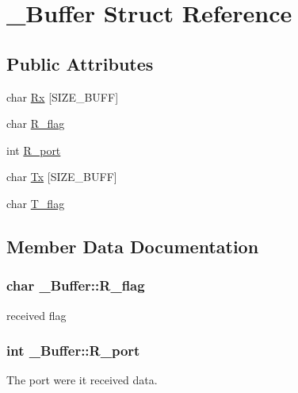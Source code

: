\hypertarget{struct___buffer}{}\section{\+\_\+\+Buffer Struct Reference}
\label{struct___buffer}
\subsection*{Public Attributes}
\begin{DoxyCompactItemize}
\item 
char \hyperlink{struct___buffer_a8c44c403d9e3f8ddefd09d410312375b}{Rx} \mbox{[}S\+I\+Z\+E\+\_\+\+B\+U\+FF\mbox{]}
\item 
char \hyperlink{struct___buffer_a1a0a34a8fecf0f33a37bc1fe856859db}{R\+\_\+flag}
\item 
int \hyperlink{struct___buffer_a7f498f79ab3e8c70f43d929bda912bfc}{R\+\_\+port}
\item 
char \hyperlink{struct___buffer_a803fdcb8a3d9d6358bf64aa8b311cb80}{Tx} \mbox{[}S\+I\+Z\+E\+\_\+\+B\+U\+FF\mbox{]}
\item 
char \hyperlink{struct___buffer_a458c1db99177167836af8505dea8bae3}{T\+\_\+flag}
\end{DoxyCompactItemize}


\subsection{Member Data Documentation}
\subsubsection[{\texorpdfstring{R\+\_\+flag}{R_flag}}]{\setlength{\rightskip}{0pt plus 5cm}char \+\_\+\+Buffer\+::\+R\+\_\+flag}\hypertarget{struct___buffer_a1a0a34a8fecf0f33a37bc1fe856859db}{}\label{struct___buffer_a1a0a34a8fecf0f33a37bc1fe856859db}
received flag 
\subsubsection[{\texorpdfstring{R\+\_\+port}{R_port}}]{\setlength{\rightskip}{0pt plus 5cm}int \+\_\+\+Buffer\+::\+R\+\_\+port}\hypertarget{struct___buffer_a7f498f79ab3e8c70f43d929bda912bfc}{}\label{struct___buffer_a7f498f79ab3e8c70f43d929bda912bfc}
The port were it received data. 
